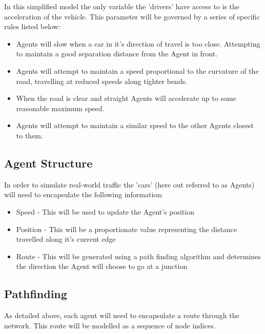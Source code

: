         In this simplified model the only variable the 'drivers' have access to is the acceleration of the vehicle. This parameter will be governed by a series of specific rules listed below:

        \begin{itemize}
            \item Agents will slow when a car in it's direction of travel is too close. Attempting to maintain a good separation distance from the Agent in front.

            \item Agents will attempt to maintain a speed proportional to the curvature of the road, travelling at reduced speeds along tighter bends.

            \item When the road is clear and straight Agents will accelerate up to some reasonable maximum speed.

            \item Agents will attempt to maintain a similar speed to the other Agents closest to them.
        \end{itemize}

    \subsection{Agent Structure}

        In order to simulate real-world traffic the 'cars' (here out referred to as Agents) will need to encapsulate the following information:

    \begin{itemize}
        \item Speed - This will be used to update the Agent's position
        \item Position - This will be a proportionate value representing the distance travelled along it's current edge
        \item Route - This will be generated using a path finding algorithm and determines the direction the Agent will choose to go at a junction
    \end{itemize}

    \subsection{Pathfinding}
    \label{design:pathfinding}

        As detailed above, each agent will need to encapsulate a route through the network. This route will be modelled as a sequence of node indices.

